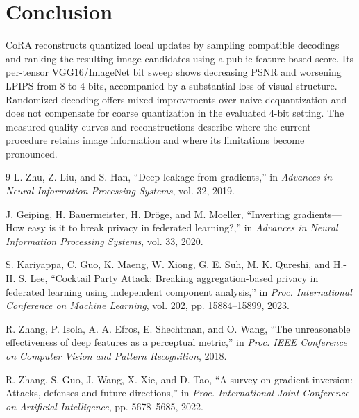 \documentclass{article}
\newcommand{\cora}{CoRA}
\begin{document}
\section{Conclusion}
\cora{} reconstructs quantized local updates by sampling compatible
decodings and ranking the resulting image candidates using a public
feature-based score. Its per-tensor VGG16/ImageNet bit sweep shows
decreasing PSNR and worsening LPIPS from 8 to 4 bits, accompanied by a
substantial loss of visual structure. Randomized decoding offers mixed
improvements over naive dequantization and does not compensate for
coarse quantization in the evaluated 4-bit setting. The measured quality
curves and reconstructions describe where the current procedure retains
image information and where its limitations become pronounced.

\begin{thebibliography}{9}
L. Zhu, Z. Liu, and S. Han,
``Deep leakage from gradients,''
in \emph{Advances in Neural Information Processing Systems}, vol. 32, 2019.

J. Geiping, H. Bauermeister, H. Dr\"oge, and M. Moeller,
``Inverting gradients---How easy is it to break privacy in federated learning?,''
in \emph{Advances in Neural Information Processing Systems}, vol. 33, 2020.

S. Kariyappa, C. Guo, K. Maeng, W. Xiong, G. E. Suh,
M. K. Qureshi, and H.-H. S. Lee,
``Cocktail Party Attack: Breaking aggregation-based privacy in federated
learning using independent component analysis,''
in \emph{Proc. International Conference on Machine Learning},
vol. 202, pp. 15884--15899, 2023.

R. Zhang, P. Isola, A. A. Efros, E. Shechtman, and O. Wang,
``The unreasonable effectiveness of deep features as a perceptual metric,''
in \emph{Proc. IEEE Conference on Computer Vision and Pattern Recognition},
2018.

R. Zhang, S. Guo, J. Wang, X. Xie, and D. Tao,
``A survey on gradient inversion: Attacks, defenses and future directions,''
in \emph{Proc. International Joint Conference on Artificial Intelligence},
pp. 5678--5685, 2022.


\end{thebibliography}
\end{document}
